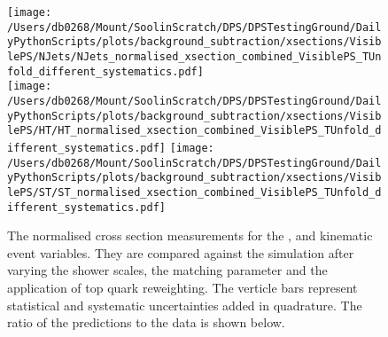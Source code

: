 \begin{figure}[hp]
	\centering
	\texttt{[image: /Users/db0268/Mount/SoolinScratch/DPS/DPSTestingGround/DailyPythonScripts/plots/background\_subtraction/xsections/VisiblePS/NJets/NJets\_normalised\_xsection\_combined\_VisiblePS\_TUnfold\_different\_systematics.pdf]} \\
	\texttt{[image: /Users/db0268/Mount/SoolinScratch/DPS/DPSTestingGround/DailyPythonScripts/plots/background\_subtraction/xsections/VisiblePS/HT/HT\_normalised\_xsection\_combined\_VisiblePS\_TUnfold\_different\_systematics.pdf]}
	\texttt{[image: /Users/db0268/Mount/SoolinScratch/DPS/DPSTestingGround/DailyPythonScripts/plots/background\_subtraction/xsections/VisiblePS/ST/ST\_normalised\_xsection\_combined\_VisiblePS\_TUnfold\_different\_systematics.pdf]} \\
	\caption[The normalised cross section measurements for the \NJET{}, \HT{} and \ST{} kinematic event variables. They are compared against the \powhegpythia{} simulation after varying the shower scales, the \hdamp{} matching parameter and the application of top quark \pt{} reweighting. The verticle bars represent statistical and systematic uncertainties added in quadrature. The ratio of the predictions to the data is shown below.]{The normalised cross section measurements for the \NJET{}, \HT{} and \ST{} kinematic event variables. They are compared against the \powhegpythia{} simulation after varying the shower scales, the \hdamp{} matching parameter and the application of top quark \pt{} reweighting. The verticle bars represent statistical and systematic uncertainties added in quadrature. The ratio of the predictions to the data is shown below.}
	\label{fig:combXSecSysNorm1}
\end{figure}
